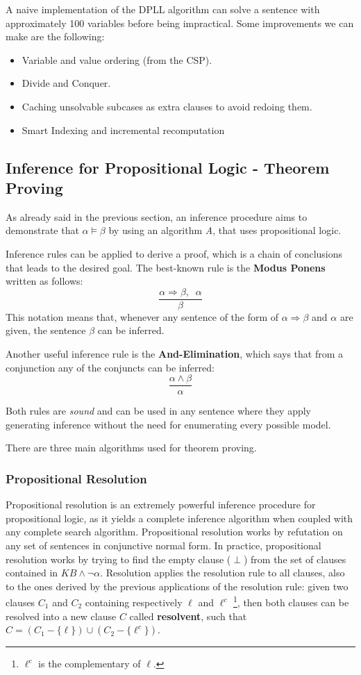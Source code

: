 \documentclass{article}
\begin{document}
A naive implementation of the DPLL algorithm can solve a sentence with approximately 100 variables before being impractical. Some improvements we can make are the following:
\begin{itemize}
    \item Variable and value ordering (from the CSP).
    \item Divide and Conquer.
    \item Caching unsolvable subcases as extra clauses to avoid redoing them.
    \item Smart Indexing and incremental recomputation 
\end{itemize}

\subsection{Inference for Propositional Logic - Theorem Proving}
As already said in the previous section, an inference procedure aims to demonstrate that $\alpha \models \beta$ by using an algorithm \textit{A}, that uses propositional logic. 

Inference rules can be applied to derive a proof, which is a chain of conclusions that leads to the desired goal. The best-known rule is the \textbf{Modus Ponens} written as follows:
\[\frac{\alpha \Rightarrow \beta, \;\; \alpha}{\beta}\]
This notation means that, whenever any sentence of the form of $\alpha \Rightarrow \beta$ and $\alpha$ are given, the sentence $\beta$ can be inferred.

Another useful inference rule is the \textbf{And-Elimination}, which says that from a conjunction any of the conjuncts can be inferred:
\[\frac{\alpha \land \beta}{\alpha}\]

Both rules are \textit{sound} and can be used in any sentence where they apply generating inference without the need for enumerating every possible model. 

There are three main algorithms used for theorem proving.

\subsubsection{Propositional Resolution}
Propositional resolution is an extremely powerful inference procedure for propositional logic, as it yields a complete inference algorithm when coupled with any complete search algorithm. Propositional resolution works by refutation on any set of sentences in conjunctive normal form. In practice, propositional resolution works by trying to find the empty clause ($\perp$) from the set of clauses contained in $KB \land \neg \alpha$. Resolution applies the resolution rule to all clauses, also to the ones derived by the previous applications of the resolution rule: given two clauses $C_1$ and $C_2$ containing respectively $\ell$ and $\ell^c$ \footnote{$\ell^c$ is the complementary of $\ell$.}, then both clauses can be resolved into a new clause $C$ called \textbf{resolvent}, such that $C=(C_1 - \{\ell\})\cup(C_2-\{\ell^c\})$.
\end{document}
